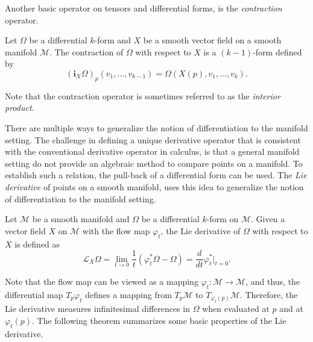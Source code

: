 Another basic operator on tensors and differential forms, is the \emph{contraction} operator.
\begin{definition}
	Let $\Omega$ be a differential $k$-form and $X$ be a smooth vector field on a smooth manifold $\mathcal M$. The contraction of $\Omega$ with respect to $X$ is a $(k-1)$-form defined by
\[
	(\mathbf i_{X}\Omega)_p(v_1,\dots,v_{k-1}) = \Omega(X(p),v_1,\dots,v_k).
\]
\end{definition}
Note that the contraction operator is sometimes referred to as the \emph{interior product}.

There are multiple ways to generalize the notion of differentiation to the manifold setting. The challenge in defining a unique derivative operator that is consistent with the conventional derivative operator in calculus, is that a general manifold setting do not provide an algebraic method to compare points on a manifold. To establish such a relation, the pull-back of a differential form can be used. The \emph{Lie derivative} of points on a smooth manifold, uses this idea to generalize the notion of differentiation to the manifold setting.
\begin{definition}
Let $\mathcal M$ be a smooth manifold and $\Omega$ be a differential $k$-form on $\mathcal M$. Given a vector field $X$ on $\mathcal M$ with the flow map $\varphi_t$, the Lie derivative of $\Omega$ with respect to $X$ is defined as
\begin{equation} \label{eq:2.10}
	\mathcal L_X \Omega = \lim_{t\to 0} \frac 1 t (\varphi^*_t \Omega - \Omega) = \frac {d}{dt} \varphi^*_t |_{t=0}.
\end{equation}
\end{definition}
Note that the flow map can be viewed as a mapping $\varphi_t:\mathcal M \to \mathcal M$, and thus, the differential map $T_p \varphi _t$ defines a mapping from $T_p \mathcal M$ to $T_{ \varphi_t(p) } \mathcal M$. Therefore, the Lie derivative measures infinitesimal differences in $\Omega$ when evaluated at $p$ and at $\varphi_t(p)$. The following theorem summarizes some basic properties of the Lie derivative.

